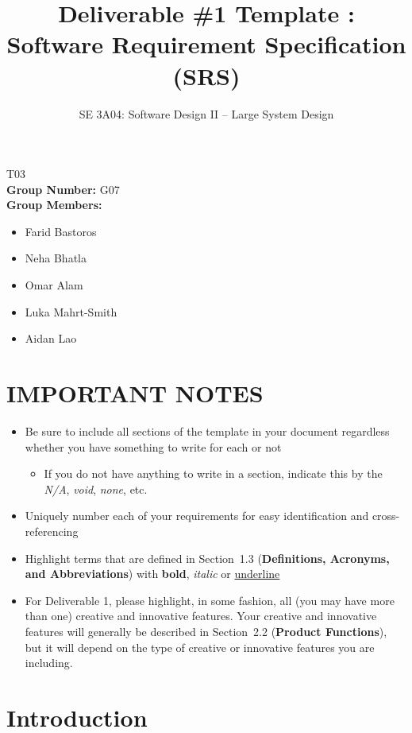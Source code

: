 \documentclass{article}
\title{Deliverable \#1 Template : Software Requirement Specification (SRS)}
\author{SE 3A04: Software Design II -- Large System Design}
\date{}
\begin{document}
\setlength{\parskip}{3pt}

\maketitle	
{} T03\\
{\bf Group Number:} G07 \\
{\bf Group Members:} 
\begin{itemize}
	\item Farid Bastoros 
	\item Neha Bhatla
	\item Omar Alam
	\item Luka Mahrt-Smith
	\item Aidan Lao
\end{itemize}

\section*{IMPORTANT NOTES}
\begin{itemize}
	\item Be sure to include all sections of the template in your document regardless whether you have something to write for each or not
	\begin{itemize}
		\item If you do not have anything to write in a section, indicate this by the \emph{N/A}, \emph{void}, \emph{none}, etc.
	\end{itemize}
	\item Uniquely number each of your requirements for easy identification and cross-referencing
	\item Highlight terms that are defined in Section~1.3 (\textbf{Definitions, Acronyms, and Abbreviations}) with \textbf{bold}, \emph{italic} or \underline{underline}
	\item For Deliverable 1, please highlight, in some fashion, all (you may have more than one) creative and innovative features. Your creative and innovative features will generally be described in Section~2.2 (\textbf{Product Functions}), but it will depend on the type of creative or innovative features you are including.
\end{itemize}

\newpage
\section{Introduction}
\label{sec:introduction}
\end{document}
